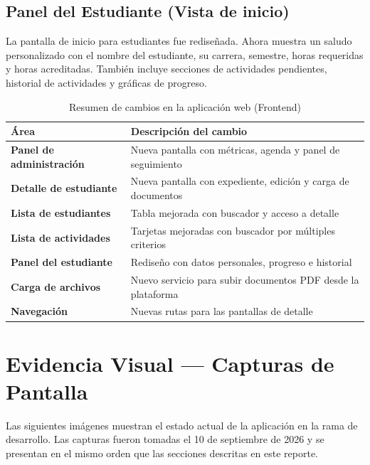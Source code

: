 \documentclass[12pt, a4paper]{article}
\begin{document}
\subsection{Panel del Estudiante (Vista de inicio)}

La pantalla de inicio para estudiantes fue rediseñada. Ahora muestra un saludo personalizado con el nombre del estudiante, su carrera, semestre, horas requeridas y horas acreditadas. También incluye secciones de actividades pendientes, historial de actividades y gráficas de progreso.

\newpage
\begin{table}[H]
  \centering
  \caption{Resumen de cambios en la aplicación web (Frontend)}
  \label{tab:frontend-changes}
  \renewcommand{\arraystretch}{1.5}
  \begin{tabular}{>{\bfseries}p{4.8cm} p{8.2cm}}
    \toprule
    Área & Descripción del cambio \\
    \midrule
    Panel de administración   & Nueva pantalla con métricas, agenda y panel de seguimiento \\[0.3em]
    Detalle de estudiante     & Nueva pantalla con expediente, edición y carga de documentos \\[0.3em]
    Lista de estudiantes      & Tabla mejorada con buscador y acceso a detalle \\[0.3em]
    Lista de actividades      & Tarjetas mejoradas con buscador por múltiples criterios \\[0.3em]
    Panel del estudiante      & Rediseño con datos personales, progreso e historial \\[0.3em]
    Carga de archivos         & Nuevo servicio para subir documentos PDF desde la plataforma \\[0.3em]
    Navegación                & Nuevas rutas para las pantallas de detalle \\
    \bottomrule
  \end{tabular}
\end{table}

\newpage
\section{Evidencia Visual — Capturas de Pantalla}

Las siguientes imágenes muestran el estado actual de la aplicación en la rama de desarrollo. Las capturas fueron tomadas el 10 de septiembre de 2026 y se presentan en el mismo orden que las secciones descritas en este reporte.
\end{document}

